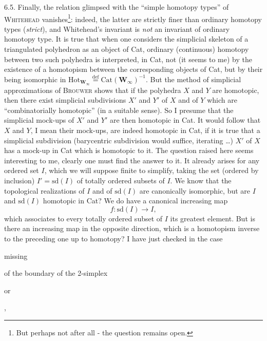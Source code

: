 6.5. Finally, the relation glimpsed with the ``simple homotopy types'' of \textsc{Whitehead} vanishes\footnote[44]{But perhaps not after all - the question remains open.}: indeed, the latter are strictly finer than ordinary homotopy types (\textit{strict}), and Whitehead's invariant is \textit{not} an invariant of ordinary homotopy type. It is true that when one considers the simplicial skeleton of a triangulated polyhedron as an object of Cat, ordinary (continuous) homotopy between two such polyhedra is interpreted, in Cat, not (it seems to me) by the existence of a homotopism between the corresponding objects of Cat, but by their being isomorphic in $\mathrm{Hot}_{\mathbf{W}_\infty} \overset{\text{def}}{=} \mathrm{Cat}(\mathbf{W}_\infty)^{-1}$. But the method of simplicial approximations of \textsc{Brouwer} shows that if the polyhedra $X$ and $Y$ are homotopic, then there exist simplicial subdivisions $X'$ and $Y'$ of $X$ and of $Y$ which are ``combinatorially homotopic'' (in a suitable sense). So I presume that the simplicial mock-ups of $X'$ and $Y'$ are then homotopic in Cat. It would follow that %
$X$ and $Y$, I mean their mock-ups, are indeed homotopic in Cat, if it is true that a simplicial subdivision (barycentric subdivision would suffice, iterating \ldots) $X'$ of $X$ has a mock-up in Cat which is homotopic to it. The question raised here seems interesting to me, clearly one must find the answer to it. It already arises for any ordered set $I$, which we will suppose finite to simplify, taking the set (ordered by inclusion) $I' = \mathrm{sd}(I)$ of totally ordered subsets of $I$. We know that the topological realizations of $I$ and of $\mathrm{sd}(I)$ are canonically isomorphic, but are $I$ and $\mathrm{sd}(I)$ homotopic in Cat? We do have a canonical increasing map %
\[ f : \mathrm{sd}(I) \longrightarrow I, \]
which associates to every totally ordered subset of $I$ its greatest element. But is there an increasing map in the opposite direction, which is a homotopism inverse to the preceding one up to homotopy? I have just checked in the case

 missing

of the boundary of the 2-simplex

\begin{center}
\qquad\qquad\qquad or \qquad\qquad\qquad
{}
\qquad\quad ,
\end{center}

